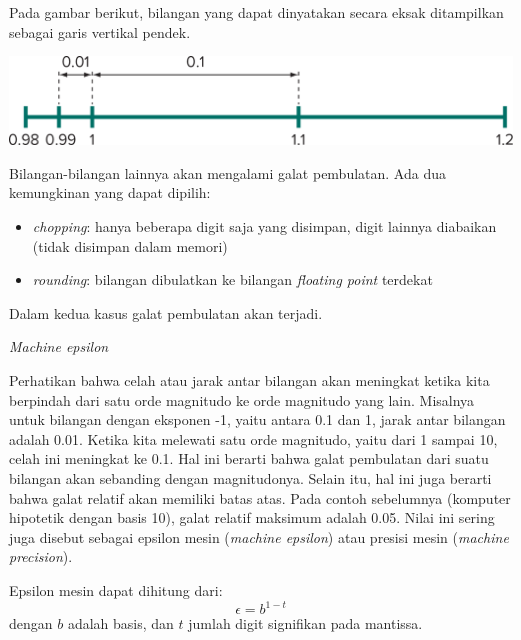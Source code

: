 \begin{frame}

Pada gambar berikut, bilangan yang dapat dinyatakan secara eksak ditampilkan sebagai garis
vertikal pendek.

{\centering
\includegraphics[height=0.2\textheight]{../chapra_python/Chapra_Fig_4_5.png}
\par}

Bilangan-bilangan lainnya akan mengalami galat pembulatan.
Ada dua kemungkinan yang dapat dipilih:
\begin{itemize}
\item \textit{chopping}: hanya beberapa digit saja yang disimpan, digit lainnya
diabaikan (tidak disimpan dalam memori)
\item \textit{rounding}: bilangan dibulatkan ke bilangan \textit{floating point}
terdekat
\end{itemize}
Dalam kedua kasus galat pembulatan akan terjadi.

\end{frame}


\begin{frame}{\textit{Machine epsilon}}

Perhatikan bahwa celah atau jarak antar bilangan akan meningkat ketika kita berpindah dari
satu orde magnitudo ke orde magnitudo yang lain. Misalnya untuk bilangan dengan
eksponen -1, yaitu antara 0.1 dan 1, jarak antar bilangan adalah 0.01. Ketika kita melewati
satu orde magnitudo, yaitu dari 1 sampai 10, celah ini meningkat ke 0.1. Hal ini berarti bahwa
galat pembulatan dari suatu bilangan akan sebanding dengan magnitudonya. Selain itu, hal ini
juga berarti bahwa galat relatif akan memiliki batas atas. Pada contoh sebelumnya (komputer
hipotetik dengan basis 10), galat relatif maksimum adalah 0.05. Nilai ini sering
juga disebut sebagai epsilon mesin (\textit{machine epsilon})
atau presisi mesin (\textit{machine precision}).

Epsilon mesin dapat dihitung dari:
$$
\epsilon = b^{1-t}
$$
dengan $b$ adalah basis, dan $t$ jumlah digit signifikan pada mantissa.

\end{frame}



